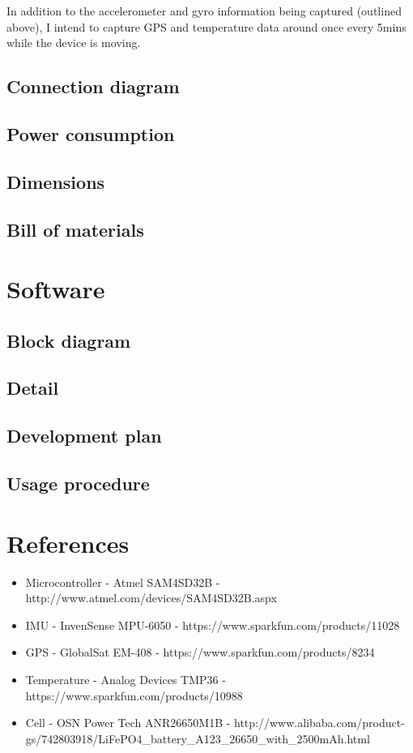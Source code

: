 \documentclass[a4paper, twoside]{article}
\begin{document}
In addition to the accelerometer and gyro information being captured (outlined
above), I intend to capture GPS and temperature data around once every 5mins while the device is
moving.

\subsection{Connection diagram}

\subsection{Power consumption}

\subsection{Dimensions}

\subsection{Bill of materials}

\section{Software}

\subsection{Block diagram}

\subsection{Detail} %

\subsection{Development plan}

\subsection{Usage procedure}

\section{References}
\begin{itemize}
	\item{Microcontroller - Atmel SAM4SD32B - http://www.atmel.com/devices/SAM4SD32B.aspx}
	\item{IMU - InvenSense MPU-6050 - https://www.sparkfun.com/products/11028}
	\item{GPS - GlobalSat EM-408 - https://www.sparkfun.com/products/8234}
	\item{Temperature - Analog Devices TMP36 - https://www.sparkfun.com/products/10988}
	\item{Cell - OSN Power Tech ANR26650M1B -
		http://www.alibaba.com/product-gs/742803918/LiFePO4\_battery\_A123\_26650\_with\_2500mAh.html}
\end{itemize}
\end{document}
